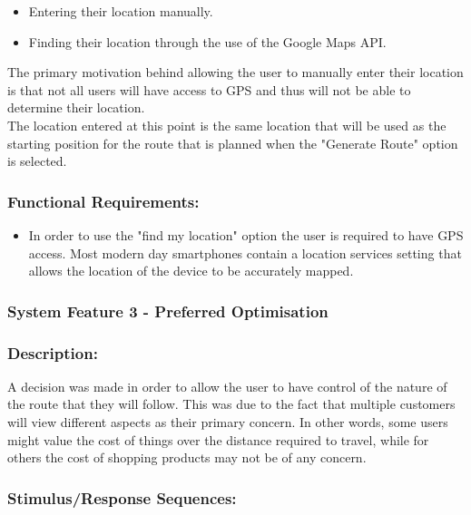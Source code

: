 \documentclass[10pt,twocolumn]{witseiepaper}
\begin{document}
		\begin{itemize}
			\item Entering their location manually.
			\item Finding their location through the use of the Google Maps API.
		\end{itemize}
		
		The primary motivation behind allowing the user to manually enter their location is that not all users will have access to GPS and thus will not be able to determine their location. \\
		
		The location entered at this point is the same location that will be used as the starting position for the route that is planned when the "Generate Route" option is selected.
		
		\subsubsection*{Functional Requirements:}
		
		\begin{itemize}
			\item In order to use the "find my location" option the user is required to have GPS access. Most modern day smartphones contain a location services setting that allows the location of the device to be accurately mapped. 
		\end{itemize}
		
		\subsubsection{System Feature 3 - Preferred Optimisation}
		
		\subsubsection*{Description:}
		
		A decision was made in order to allow the user to have control of the nature of the route that they will follow. This was due to the fact that multiple customers will view different aspects as their primary concern. In other words, some users might value the cost of things over the distance required to travel, while for others the cost of shopping products may not be of any concern. 
		
		\subsubsection*{Stimulus/Response Sequences:}
		
\end{document}
